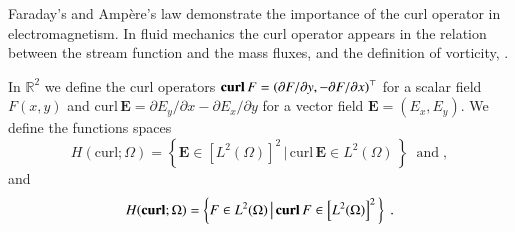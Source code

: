 \documentclass[graybox]{svmult}
\begin{document}
Faraday's and Amp\`{e}re's law demonstrate the importance of the curl operator in electromagnetism. In fluid mechanics the curl operator appears in the relation between the stream function and the mass fluxes, and the definition of vorticity, \cite{MEEVC}.

In $\mathbb{R}^2$ we define the curl operators $\mbox{\bf{curl}}\,F = \left ( \partial F/\partial y,-\partial F/\partial x \right )^{\top}$ for a scalar field $F(x,y)$ and $\mbox{curl}\,\bm{E} = \partial E_y/\partial x - \partial E_x/\partial y$ for a vector field $\bm{E}=\left ( E_x,E_y \right )$. We define the functions spaces
\begin{equation}
H(\mbox{curl};\Omega) = \left \{ \bm{E} \in \left [ L^2(\Omega) \right ]^2 \,\big | \, \mbox{curl}\,\bm{E} \in L^2(\Omega) \, \right \} \;\; \mbox{and} \;,
\end{equation}
and
\begin{equation}
H(\mbox{\bf{curl}};\Omega) = \left \{ F \in  L^2(\Omega) \,\big | \, \mbox{\bf{curl}}\,F \in \left [ L^2(\Omega) \right ]^2 \, \right \} \;.
\end{equation}
\end{document}
